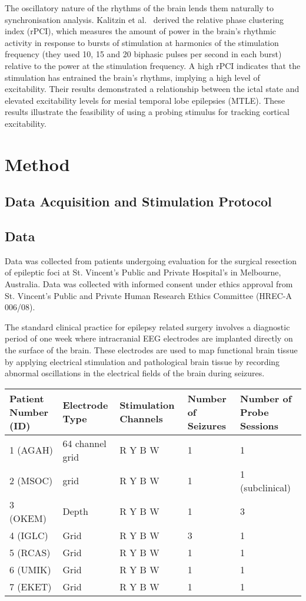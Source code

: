 \documentclass[]{article}
\begin{document}
The oscillatory nature of the rhythms of the brain lends them naturally to synchronisation analysis. 
Kalitzin et al.~\cite{Kalitzin2005} derived the relative phase clustering index (rPCI), which measures the amount of power in the brain’s rhythmic activity in response to bursts of stimulation at harmonics of the stimulation frequency (they used 10, 15 and 20 biphasic pulses per second in each burst) relative to the power at the stimulation frequency. A high rPCI indicates that the stimulation has entrained the brain’s rhythms, implying a high level of excitability. Their results demonstrated a relationship between the ictal state and elevated excitability levels for mesial temporal lobe epilepsies (MTLE). These results illustrate the feasibility of using a probing stimulus for tracking cortical excitability.

\section{Method}
\subsection{Data Acquisition and Stimulation Protocol}
\subsection{Data}
Data was collected from patients undergoing evaluation for the surgical resection of epileptic foci at St. Vincent's Public and Private Hospital's in Melbourne, Australia. Data was collected with informed consent under ethics approval from St. Vincent's Public and Private Human Research Ethics Committee (HREC-A 006/08).

The standard clinical practice for epilepsy related surgery involves a diagnostic period of one week where intracranial EEG electrodes are implanted directly on the surface of the brain. These electrodes are used to map functional brain tissue by applying electrical stimulation and pathological brain tissue by recording abnormal oscillations in the electrical fields of the brain during seizures. 

\begin{tabular}{|p{2.4cm}|p{2.4cm}|p{2.4cm}|p{2.4cm}|p{3cm}|} \hline
\textbf{Patient Number (ID)} & \textbf{Electrode Type} & \textbf{Stimulation Channels} & \textbf{Number of Seizures} & \textbf{Number of Probe Sessions}\\ \hline
1 (AGAH) & 64 channel grid & R Y B W & 1 & 1 \\ \hline
2 (MSOC) & grid & R Y B W & 1 & 1 (subclinical) \\ \hline
3 (OKEM) & Depth & R Y B W & 1 & 3 \\ \hline
4 (IGLC) & Grid & R Y B W & 3 & 1 \\ \hline
5 (RCAS) & Grid & R Y B W & 1 & 1 \\ \hline
6 (UMIK) & Grid & R Y B W & 1 & 1 \\ \hline
7 (EKET) & Grid & R Y B W & 1 & 1 \\ \hline
\end{tabular}
\end{document}
